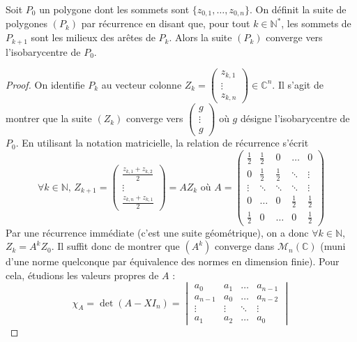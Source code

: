 
	\begin{theorem}
		Soit $P_0$ un polygone dont les sommets sont $\{ z_{0,1}, \dots, z_{0,n} \}$. On définit la suite de polygones $(P_k)$ par récurrence en disant que, pour tout $k \in \mathbb{N}^*$, les sommets de $P_{k+1}$ sont les milieux des arêtes de $P_k$.
		Alors la suite $(P_k)$ converge vers l'isobarycentre de $P_0$.
	\end{theorem}

	\begin{proof}
		On identifie $P_k$ au vecteur colonne $Z_k = \begin{pmatrix} z_{k,1} \\ \vdots \\ z_{k,n} \end{pmatrix} \in \mathbb{C}^n$. Il s'agit de montrer que la suite $(Z_k)$ converge vers $\begin{pmatrix} g \\ \vdots \\ g \end{pmatrix}$ où $g$ désigne l'isobarycentre de $P_0$.
		\newpar
		En utilisant la notation matricielle, la relation de récurrence s'écrit
		\[ \forall k \in \mathbb{N}, \, Z_{k+1} = \begin{pmatrix} \frac{z_{k,1} + z_{k,2}}{2} \\ \vdots \\ \frac{z_{k,n} + z_{k,1}}{2} \end{pmatrix} = AZ_k \text{ où } A = \begin{pmatrix} \frac{1}{2} & \frac{1}{2} & 0 & \dots & 0 \\ 0 & \frac{1}{2} & \frac{1}{2} & \ddots & \vdots \\ \vdots & \ddots & \ddots & \ddots & \vdots \\ 0 & \dots & 0 & \frac{1}{2} & \frac{1}{2} \\ \frac{1}{2} & 0 & \dots & 0 & \frac{1}{2} \end{pmatrix} \]
		Par une récurrence immédiate (c'est une suite géométrique), on a donc $\forall k \in \mathbb{N}$, $Z_k = A^k Z_0$. Il suffit donc de montrer que $(A^k)$ converge dans $\mathcal{M}_n(\mathbb{C})$ (muni d'une norme quelconque par équivalence des normes en dimension finie).
		\newpar
		Pour cela, étudions les valeurs propres de $A$ :
		\[ \chi_A = \det(A - X I_n) = \begin{vmatrix} a_0 & a_1 & \dots & a_{n-1} \\ a_{n-1} & a_0 & \dots & a_{n-2}\\ \vdots & \vdots & \ddots & \vdots \\ a_1 & a_2 & \dots & a_0 \end{vmatrix} \]

\end{proof}
